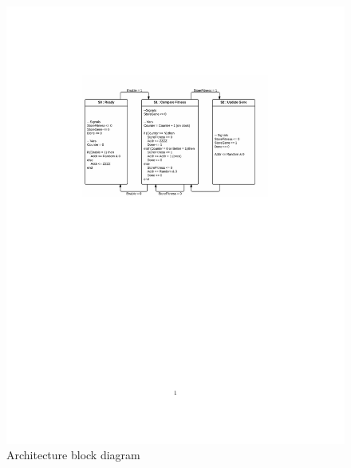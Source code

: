 \begin{figure}

  \centering
  \includegraphics[trim=5cm 16cm 1cm 5cm, clip=true ]{fpga/fig/selection_core_state_machine.pdf}
  \caption{Architecture block diagram}
  \label{fpga:fig:selection:selection_core_data_path}
\end{figure}
